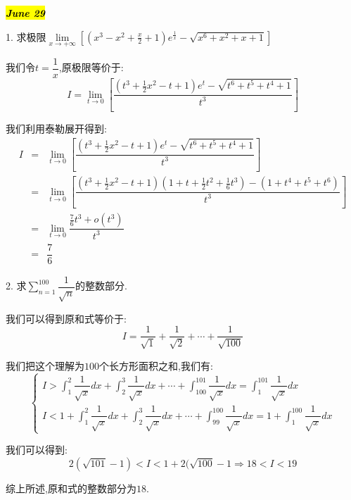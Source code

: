 \hl{\textbf{\textit{June 29}}}

1. 求极限$\lim\limits_{x\rightarrow +\infty}\left[(x^3-x^2+\frac{x}{2}+1)e^{\frac{1}{x}}-\sqrt{x^6+x^2+x+1} \right] $
\begin{solution}
	
	我们令$t=\dfrac{1}{x}$,原极限等价于: 
	$$I=\lim\limits_{t\rightarrow 0}\left[ \dfrac{(t^3+\frac{1}{2}x^2-t+1)e^t-\sqrt{t^6+t^5+t^4+1}}{t^3}\right] $$
	
	我们利用泰勒展开得到: 
	\begin{eqnarray*}
		I&=&\lim\limits_{t\rightarrow 0}\left[ \dfrac{(t^3+\frac{1}{2}x^2-t+1)e^t-\sqrt{t^6+t^5+t^4+1}}{t^3}\right]\\
		&=&\lim\limits_{t\rightarrow 0}\left[ \dfrac{(t^3+\frac{1}{2}x^2-t+1)(1+t+\frac{1}{2}t^2+\frac{1}{6}t^3)-(1+t^4+t^5+t^6)}{t^3}\right]\\
		&=&\lim\limits_{t\rightarrow 0}\dfrac{\frac{7}{6}t^3+o(t^3)}{t^3}\\
		&=&\dfrac{7}{6}
	\end{eqnarray*}
\end{solution}

2. 求$\sum\limits_{n=1}^{100}\dfrac{1}{\sqrt{n}}$的整数部分.
\begin{solution}
	
	我们可以得到原和式等价于: 
	$$I=\dfrac{1}{\sqrt{1}}+\dfrac{1}{\sqrt{2}}+\cdots+\dfrac{1}{\sqrt{100}}$$
	
	我们把这个理解为$100$个长方形面积之和,我们有: 
	$$\left\lbrace
	\begin{array}{l}
		I>\int_{1}^{2}\dfrac{1}{\sqrt{x}}dx+\int_{2}^{3}\dfrac{1}{\sqrt{x}}dx+\cdots+\int_{100}^{101}\dfrac{1}{\sqrt{x}}dx=\int_{1}^{101}\dfrac{1}{\sqrt{x}}dx\\
		I<1+\int_{1}^{2}\dfrac{1}{\sqrt{x}}dx+\int_{2}^{3}\dfrac{1}{\sqrt{x}}dx+\cdots+\int_{99}^{100}\dfrac{1}{\sqrt{x}}dx=1+\int_{1}^{100}\dfrac{1}{\sqrt{x}}dx
	\end{array}
	\right. $$
	
	我们可以得到: 
	$$2(\sqrt{101}-1)<I<1+2(\sqrt{100}-1\Rightarrow 18<I<19$$
	
	综上所述,原和式的整数部分为$18$.
\end{solution}

